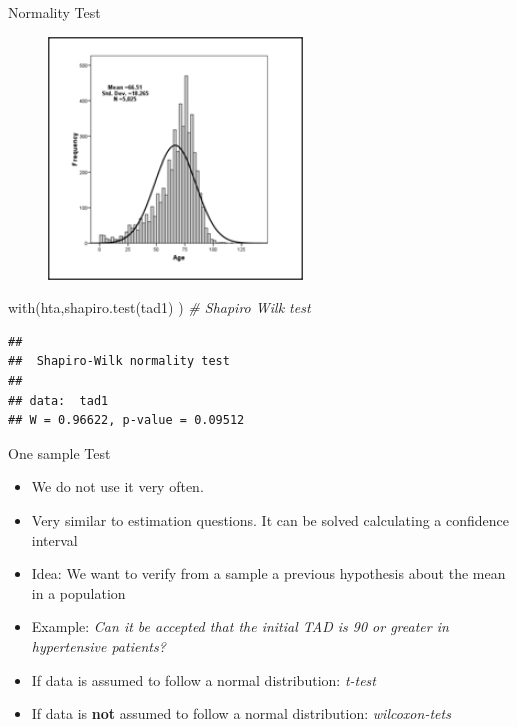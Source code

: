 \documentclass[
  ignorenonframetext,
]{beamer}
\newenvironment{Shaded}{\begin{snugshade}}{\end{snugshade}}
\newcommand{\CommentTok}[1]{\textcolor[rgb]{0.56,0.35,0.01}{\textit{#1}}}
\newcommand{\FunctionTok}[1]{\textcolor[rgb]{0.00,0.00,0.00}{#1}}
\newcommand{\NormalTok}[1]{#1}
\begin{document}
\begin{frame}[fragile]{Normality Test}
\protect\hypertarget{normality-test}{}
\begin{figure}
\includegraphics[width=0.8\linewidth]{images/normalityplot} \end{figure}

\small

\begin{Shaded}
\begin{Highlighting}[]
\FunctionTok{with}\NormalTok{(hta,}\FunctionTok{shapiro.test}\NormalTok{(tad1) ) }\CommentTok{\# Shapiro Wilk test}
\end{Highlighting}
\end{Shaded}

\begin{verbatim}
## 
##  Shapiro-Wilk normality test
## 
## data:  tad1
## W = 0.96622, p-value = 0.09512
\end{verbatim}
\end{frame}

\begin{frame}{One sample Test}
\protect\hypertarget{one-sample-test}{}
\begin{itemize}
\item
  We do not use it very often.
\item
  Very similar to estimation questions. It can be solved calculating a
  confidence interval
\item
  Idea: We want to verify from a sample a previous hypothesis about the
  mean in a population
\item
  Example: \emph{Can it be accepted that the initial TAD is 90 or
  greater in hypertensive patients?}
\item
  If data is assumed to follow a normal distribution: \emph{t-test}
\item
  If data is \textbf{not} assumed to follow a normal distribution:
  \emph{wilcoxon-tets}
\end{itemize}
\end{frame}
\end{document}
